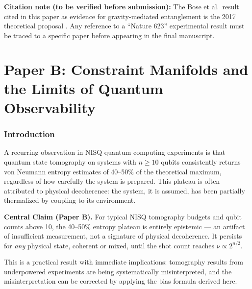 \documentclass[12pt,letterpaper]{article}
\theoremstyle{plain}
\theoremstyle{definition}
\theoremstyle{remark}
\begin{document}
\vspace{1cm}
\noindent\textbf{Citation note (to be verified before submission):}
The Bose et al.\ result cited in this paper as evidence for
gravity-mediated entanglement is the 2017 theoretical proposal
\cite{bose2017}. Any reference to a ``Nature 623'' experimental result
must be traced to a specific paper before appearing in the final
manuscript.

\newpage
\part*{Paper B: Constraint Manifolds and the Limits of Quantum Observability}

\section{Introduction}
\label{sec:intro_B}

A recurring observation in NISQ quantum computing experiments is that
quantum state tomography on systems with $n \geq 10$ qubits consistently
returns von Neumann entropy estimates of 40--50\% of the theoretical
maximum, regardless of how carefully the system is prepared. This plateau
is often attributed to physical decoherence: the system, it is assumed,
has been partially thermalized by coupling to its environment.

\begin{corestatement}
\textbf{Central Claim (Paper B).} For typical NISQ tomography budgets
and qubit counts above 10, the 40--50\% entropy plateau is entirely
epistemic --- an artifact of insufficient measurement, not a signature
of physical decoherence. It persists for \emph{any} physical state,
coherent or mixed, until the shot count reaches $\nu \propto 2^{n/2}$.
\end{corestatement}

This is a practical result with immediate implications: tomography
results from underpowered experiments are being systematically
misinterpreted, and the misinterpretation can be corrected by applying
the bias formula derived here.
\end{document}
